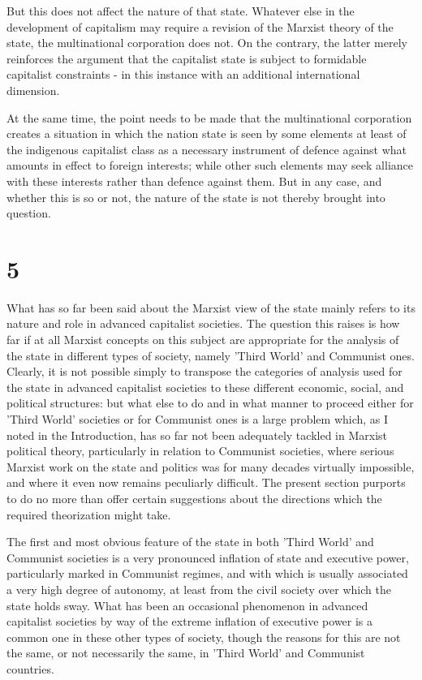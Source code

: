 But this does not affect the nature of that state. Whatever else in the development of capitalism may require a revision of the Marxist theory of the state, the multinational corporation does not. On the contrary, the latter merely reinforces the argument that the capitalist state is subject to formidable capitalist constraints - in this instance with an additional international dimension.

At the same time, the point needs to be made that the multinational corporation creates a situation in which the nation state is seen by some elements at least of the indigenous capitalist class as a necessary instrument of defence against what amounts in effect to foreign interests; while other such elements may seek alliance with these interests rather than defence against them. But in any case, and whether this is so or not, the nature of the state is not thereby brought into question.

\section*{5}
What has so far been said about the Marxist view of the state mainly refers to its nature and role in advanced capitalist societies. The question this raises is how far if at all Marxist concepts on this subject are appropriate for the analysis of the state in different types of society, namely 'Third World' and Communist ones. Clearly, it is not possible simply to transpose the categories of analysis used for the state in advanced capitalist societies to these different economic, social, and political structures: but what else to do and in what manner to proceed either for 'Third World' societies or for Communist ones is a large problem which, as I noted in the Introduction, has so far not been adequately tackled in Marxist political theory, particularly in relation to Communist societies, where serious Marxist work on the state and politics was for many decades virtually impossible, and where it even now remains peculiarly difficult. The present section purports to do no more than offer certain suggestions about the directions which the required theorization might take.

The first and most obvious feature of the state in both 'Third  World' and Communist societies is a very pronounced inflation of state and executive power, particularly marked in Communist regimes, and with which is usually associated a very high degree of autonomy, at least from the civil society over which the state holds sway. What has been an occasional phenomenon in advanced capitalist societies by way of the extreme inflation of executive power is a common one in these other types of society, though the reasons for this are not the same, or not necessarily the same, in 'Third World' and Communist countries.

